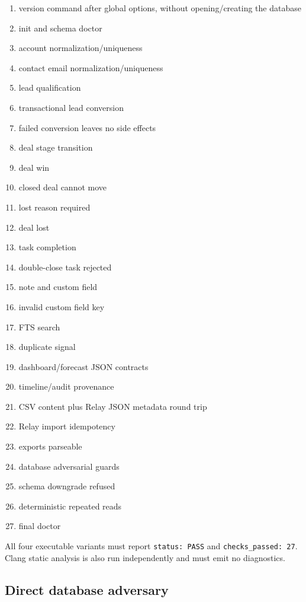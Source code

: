\documentclass[
]{article}
\providecommand{\tightlist}{%
  \setlength{\itemsep}{0pt}\setlength{\parskip}{0pt}}
\begin{document}
\begin{enumerate}
\def\labelenumi{\arabic{enumi}.}
\tightlist
\item
  version command after global options, without opening/creating the
  database
\item
  init and schema doctor
\item
  account normalization/uniqueness
\item
  contact email normalization/uniqueness
\item
  lead qualification
\item
  transactional lead conversion
\item
  failed conversion leaves no side effects
\item
  deal stage transition
\item
  deal win
\item
  closed deal cannot move
\item
  lost reason required
\item
  deal lost
\item
  task completion
\item
  double-close task rejected
\item
  note and custom field
\item
  invalid custom field key
\item
  FTS search
\item
  duplicate signal
\item
  dashboard/forecast JSON contracts
\item
  timeline/audit provenance
\item
  CSV content plus Relay JSON metadata round trip
\item
  Relay import idempotency
\item
  exports parseable
\item
  database adversarial guards
\item
  schema downgrade refused
\item
  deterministic repeated reads
\item
  final doctor
\end{enumerate}

All four executable variants must report \texttt{status:\ PASS} and
\texttt{checks\_passed:\ 27}. Clang static analysis is also run
independently and must emit no diagnostics.

\subsection{Direct database adversary}\label{direct-database-adversary}
\end{document}
